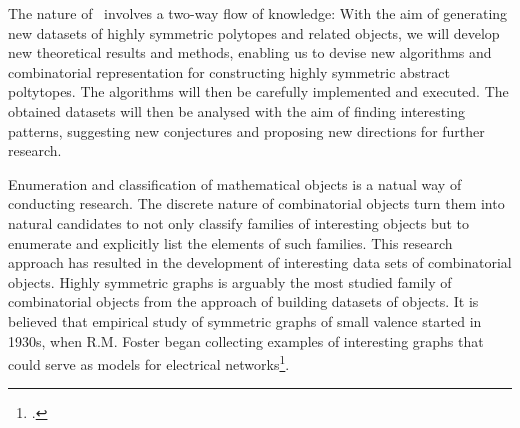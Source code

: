 The nature of \ourp\ involves a two-way flow of knowledge:
With the aim of generating new datasets of highly symmetric polytopes and related objects, we will develop new theoretical results and methods, enabling us to devise new algorithms and combinatorial representation for constructing highly symmetric abstract poltytopes.
The algorithms will then be carefully implemented and executed.
The obtained datasets will then be analysed with the aim of finding interesting patterns, suggesting new conjectures and proposing new directions for further research.


Enumeration and classification of mathematical objects is a natual way of conducting research.
The discrete nature of combinatorial objects turn them into natural candidates to not only classify families of interesting objects but to enumerate and explicitly list the elements of such families.
This research approach has resulted in the development of interesting data sets of combinatorial objects.
Highly symmetric graphs is arguably the most studied family of combinatorial objects from the approach of building datasets of objects.
It is believed that empirical study of symmetric graphs of small valence started in 1930s, when R.M. Foster began collecting examples of interesting graphs that could serve as models for electrical networks\footcite{Foster_1932_GeometricalCircuitsElectrical}.


